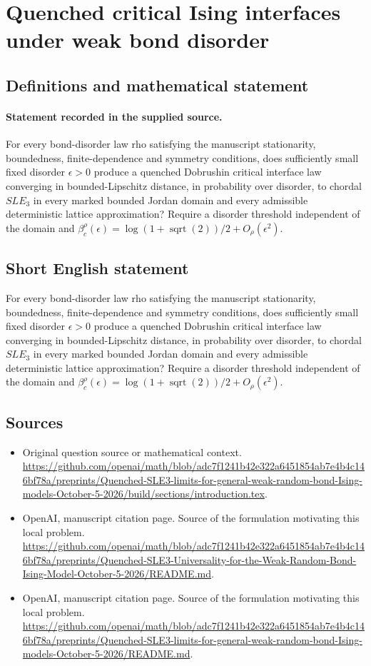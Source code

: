 \documentclass[11pt]{article}
\begin{document}
\section*{Quenched critical Ising interfaces under weak bond disorder}\label{statement}
\subsection{Definitions and mathematical statement}
\paragraph{Statement recorded in the supplied source.}
For every bond-disorder law rho satisfying the manuscript stationarity, boundedness, finite-dependence and symmetry conditions, does sufficiently small fixed disorder $\epsilon >0$ produce a quenched Dobrushin critical interface law converging in bounded-Lipschitz distance, in probability over disorder, to chordal $SLE_3$ in every marked bounded Jordan domain and every admissible deterministic lattice approximation? Require a disorder threshold independent of the domain and $\beta _c^\rho (\epsilon )=\log (1+\operatorname{sqrt}(2))/2+O_\rho (\epsilon ^2)$.
\subsection{Short English statement}
For every bond-disorder law rho satisfying the manuscript stationarity, boundedness, finite-dependence and symmetry conditions, does sufficiently small fixed disorder $\epsilon >0$ produce a quenched Dobrushin critical interface law converging in bounded-Lipschitz distance, in probability over disorder, to chordal $SLE_3$ in every marked bounded Jordan domain and every admissible deterministic lattice approximation? Require a disorder threshold independent of the domain and $\beta _c^\rho (\epsilon )=\log (1+\operatorname{sqrt}(2))/2+O_\rho (\epsilon ^2)$.
\subsection{Sources}
\begin{itemize}
\item[S1] Original question source or mathematical context.
\url{https://github.com/openai/math/blob/adc7f1241b42e322a6451854ab7e4b4c146bf78a/preprints/Quenched-SLE3-limits-for-general-weak-random-bond-Ising-models-October-5-2026/build/sections/introduction.tex}.
\item[S2] OpenAI, manuscript citation page. Source of the formulation motivating this local problem.
\url{https://github.com/openai/math/blob/adc7f1241b42e322a6451854ab7e4b4c146bf78a/preprints/Quenched-SLE3-Universality-for-the-Weak-Random-Bond-Ising-Model-October-5-2026/README.md}.
\item[S3] OpenAI, manuscript citation page. Source of the formulation motivating this local problem.
\url{https://github.com/openai/math/blob/adc7f1241b42e322a6451854ab7e4b4c146bf78a/preprints/Quenched-SLE3-limits-for-general-weak-random-bond-Ising-models-October-5-2026/README.md}.
\end{itemize}
\end{document}
